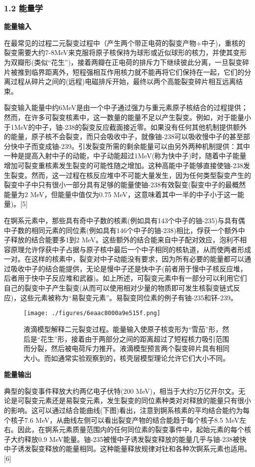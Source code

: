 \subsubsection{1.2 能量学}
\textbf{能量输入}

在最常见的过程二元裂变过程中（产生两个带正电荷的裂变产物+中子)，重核的裂变需要大约7-8MeV来克服将原子核保持为球形或近似球形的核力，并使其变形为双瓣形(类似“花生”)，接着两瓣在正电荷的排斥力下继续彼此分离，一旦裂变碎片被推到临界距离外，短程强相互作用核力就不能再将它们保持在一起，它们的分离过程从碎片之间的(远程)电磁排斥开始，最终以两个高能裂变碎片相互远离结束。

裂变输入能量中约6MeV是由一个中子通过强力与重元素原子核结合的过程提供；然而，在许多可裂变核素中，这一数量的能量不足以产生裂变。例如，对于能量小于1MeV的中子，铀-238的裂变反应截面接近零。如果没有任何其他机制提供额外的能量，原子核不会裂变，而只会吸收中子，就像铀-238可以吸收慢中子的甚至部分快中子而变成铀-239。引发裂变所需的剩余能量可以由另外两种机制提供：其中一种是提高入射中子的动能，中子动能超过1MeV(称为快中子)时，随着中子能量增加可裂变重核素发生裂变的可能性随之增加。这种高能中子能够直接使铀-238发生裂变。然而，这一过程在核反应堆中不可能大量发生，因为任何类型裂变产生的裂变中子中只有很小一部分具有足够的能量使铀-238有效裂变(裂变中子的最概然能量为2 MeV，但能量中值仅为0.75 MeV，这意味着其中一半的中子小于这一能量)。[5]

在锕系元素中，那些具有奇中子数的核素(例如具有143个中子的铀-235)与具有偶中子数的相同元素的同位素(例如具有146个中子的铀-238)相比，俘获一个额外中子释放的结合能要多1到2 MeV。这些额外的结合能来自中子配对效应，泡利不相容原理允许俘获中子占据与原子核中最后一个中子相同的核轨道，从而使两者形成一对。在这样的核素中，裂变对中子动能没有要求，因为所有必要的能量都可以通过吸收中子的结合能提供，无论是慢中子还是快中子(前者用于慢中子核反应堆，后者用于快中子反应堆和武器)。如上所述，可裂变元素中有一部分可以利用它们自己的裂变中子产生裂变(从而可以使用相对少量的物质即可发生核裂变链式反应)，这些元素被称为“易裂变元素”。易裂变同位素的例子有铀-235和钚-239。
\begin{figure}[ht]
\centering
\texttt{[image: ./figures/6eaac8000a9e515f.png]}
\caption{液滴模型解释二元裂变过程。能量输入使原子核变形为“雪茄”形，然后是“花生”形，接着由于两部分之间的距离超过了短程核力吸引范围而分裂，然后被电荷斥力推开。液滴模型预言两个裂变碎片具有相同大小。而如通常实验观察到的，核壳层模型理论允许它们大小不同。} \label{fig_HLB_3}
\end{figure}

\textbf{能量输出}

典型的裂变事件释放大约两亿电子伏特(200 MeV)，相当于大约2万亿开尔文。无论是可裂变元素还是易裂变元素，发生裂变的同位素种类对对释放的能量只有很小的影响。这可以通过结合能曲线(下图)看出，注意到锕系核素的平均结合能约为每个核子7.6 MeV，从曲线左侧可以看出裂变产物的结合能趋于每个核子8.5 MeV左右。因此，在锕系元素质量范围内的任何同位素的裂变事件中，起始元素的每个核子大约释放0.9 MeV能量。铀-235被慢中子诱发裂变释放的能量几乎与铀-238被快中子诱发裂变释放的能量相同。这种能量释放规律对钍和各种次锕系元素也适用。[6]

